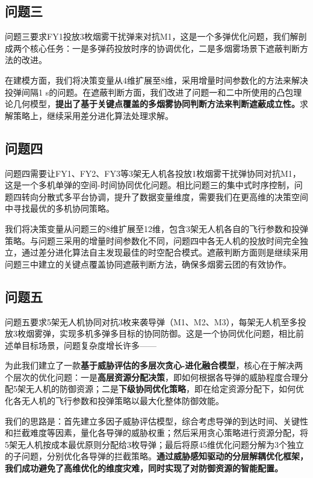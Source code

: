 \documentclass[fontset=SimSun]{ctexart}
\begin{document}
\subsection{问题三}
问题三要求FY1投放3枚烟雾干扰弹来对抗M1，这是一个多弹优化问题，我们解剖成两个核心任务：一是多弹药投放时序的协调优化，二是多烟雾场景下遮蔽判断方法的改进。

在建模方面，我们将决策变量从4维扩展至8维，采用增量时间参数化的方法来解决投弹间隔1 s的问题。在遮蔽判断方面，我们改进了问题一和二中所使用的凸包理论几何模型，\textbf{提出了基于关键点覆盖的多烟雾协同判断方法来判断遮蔽成立性。}求解策略上，继续采用差分进化算法处理求解。

\subsection{问题四}
问题四需要让FY1、FY2、FY3等3架无人机各投放1枚烟雾干扰弹协同对抗M1，这是一个多机单弹的空间-时间协同优化问题。相比问题三的集中式时序控制，问题四转向分散式多平台协调，提升了数据变量维度，需要我们在更高维的决策空间中寻找最优的多机协同策略。

我们将决策变量从问题三的8维扩展至12维，包含3架无人机各自的飞行参数和投弹策略。与问题三采用的增量时间参数化不同，问题四中各无人机的投放时间完全独立，通过差分进化算法自主发现最佳的时空配合模式。遮蔽判断方面则是继续采用问题三中建立的关键点覆盖协同遮蔽判断方法，确保多烟雾云团的有效协作。

\subsection{问题五}
问题五要求5架无人机协同对抗3枚来袭导弹（M1、M2、M3），每架无人机至多投放3枚烟雾弹，实现多机多弹多目标的协同防御。这是一个协同优化问题，相比前述单目标场景，问题复杂度增长许多——

为此我们建立了一款\textbf{基于威胁评估的多层次贪心-进化融合模型}，核心在于解决两个层次的优化问题：一是\textbf{高层资源分配决策}，即如何根据各导弹的威胁程度合理分配5架无人机的防御资源；二是\textbf{下级协同优化策略}，即在给定资源分配下，如何优化各无人机的飞行参数和投弹策略以最大化整体防御效能。

我们的思路是：首先建立多因子威胁评估模型，综合考虑导弹的到达时间、关键性和拦截难度等因素，量化各导弹的威胁权重；然后采用贪心策略进行资源分配，将5架无人机按成本最优原则分配给3枚导弹；最后将原45维优化问题分解为3个独立的子问题，分别优化各导弹的拦截策略。\textbf{通过威胁感知驱动的分层解耦优化框架，我们成功避免了高维优化的维度灾难，同时实现了对防御资源的智能配置。}
\end{document}

